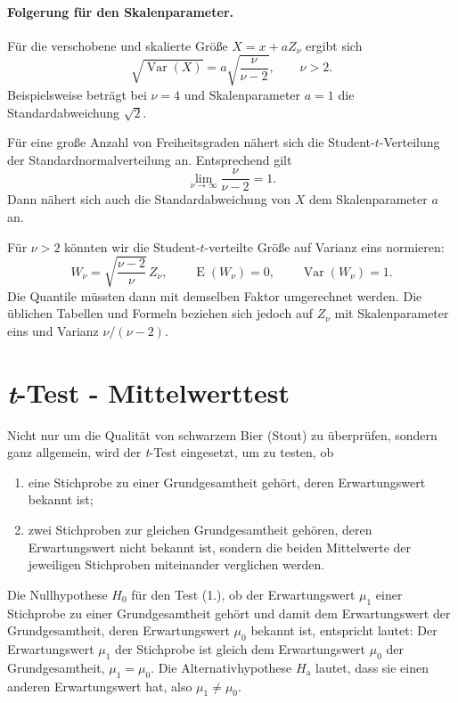 \paragraph{Folgerung für den Skalenparameter.}

Für die verschobene und skalierte Größe $X=x+aZ_\nu$ ergibt sich
\begin{equation}
\boxed{
\sqrt{\operatorname{Var}(X)}
=
a\sqrt{\frac{\nu}{\nu-2}},
\qquad \nu>2.
}
\end{equation}
Beispielsweise beträgt bei $\nu=4$ und Skalenparameter $a=1$
die Standardabweichung $\sqrt{2}$.

Für eine große Anzahl von Freiheitsgraden nähert sich die Student-$t$-Verteilung der Standardnormalverteilung an. Entsprechend gilt
\begin{equation}
\lim_{\nu\to\infty}\frac{\nu}{\nu-2}=1.
\end{equation}
Dann nähert sich auch die Standardabweichung von $X$
dem Skalenparameter $a$ an.

Für $\nu>2$ könnten wir die Student-$t$-verteilte Größe auf Varianz eins
normieren:
\begin{equation}
W_\nu
=
\sqrt{\frac{\nu-2}{\nu}}\,Z_\nu,
\qquad
\operatorname E(W_\nu)=0,
\qquad
\operatorname{Var}(W_\nu)=1.
\end{equation}
Die Quantile müssten dann mit demselben Faktor umgerechnet werden.
Die üblichen Tabellen und Formeln beziehen sich jedoch auf
$Z_\nu$ mit Skalenparameter eins und Varianz $\nu/(\nu-2)$.



\section{\textsl{t}-Test - Mittelwerttest}


Nicht nur um die Qualität von schwarzem Bier (Stout) zu überprüfen, sondern ganz
allgemein, wird der \textsl{t}-Test eingesetzt, um zu testen, ob
\begin{enumerate}
\item eine Stichprobe zu einer Grundgesamtheit gehört,
 deren Erwartungswert bekannt ist;
\item zwei Stichproben zur gleichen Grundgesamtheit gehören,
 deren Erwartungswert nicht bekannt ist, sondern die beiden
 Mittelwerte der jeweiligen Stichproben miteinander verglichen werden.
\end{enumerate}

Die Nullhypothese $H_0$ für den Test (1.), ob der Erwartungswert $\mu_1$ einer
Stichprobe zu einer Grundgesamtheit gehört
und damit dem Erwartungswert der Grundgesamtheit, deren Erwartungswert $\mu_0$ bekannt ist,
entspricht lautet: Der Erwartungswert $\mu_1$ der Stichprobe
ist gleich dem  Erwartungswert $\mu_0$ der Grundgesamtheit, $\mu_1 = \mu_0$.
Die Alternativhypothese $H_\mathrm{a}$
lautet, dass sie einen anderen Erwartungswert hat, also $\mu_1 \neq \mu_0$.

